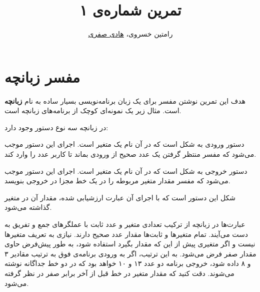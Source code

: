 \documentclass{utap}
\title{تمرین شماره‌ی ۱}
\author{رامتین خسروی، \href{mailto:hadi.safari@ut.ac.ir?subject=[AP\%20S98 A1]\%20}{هادی صفری}}
\begin{document}
    \maketitle

    \section{مفسر زبانچه}

    هدف این تمرین نوشتن مفسر برای یک زبان برنامه‌نویسی بسیار ساده به نام \textbf{زبانچه} است. مثال زیر یک نمونه‌ای کوچک از برنامه‌های زبانچه است.

    \begin{latin}
    
    \end{latin}

    در زبانچه سه نوع دستور وجود دارد:

    \begin{description}[leftmargin=6em,style=nextline,font=\labelitemi\quad\bfseries]
    \item[ورودی]
    دستور ورودی به شکل  است که در آن  نام یک متغیر است. اجرای این دستور موجب می‌شود که مفسر منتظر گرفتن یک عدد صحیح از ورودی بماند تا کاربر عدد را وارد کند.
    \item[خروجی]
    دستور خروجی به شکل  است که در آن  نام یک متغیر است. اجرای این دستور موجب می‌شود که مفسر مقدار متغیر مربوطه را در یک خط مجزا در خروجی بنویسد.
    \item[جایگزینی]
    شکل این دستور  است که با اجرای آن عبارت  ارزشیابی شده، مقدار آن در متغیر  گذاشته می‌شود.
    \end{description}

    عبارت‌ها در زبانچه از ترکیب تعدادی متغیر و عدد ثابت با عملگرهای جمع و تفریق به دست می‌آیند. تمام متغیرها و ثابت‌ها مقدار عدد صحیح دارند. نیازی به تعریف متغیرها نیست و اگر متغیری پیش از این که مقدار بگیرد استفاده شود، به طور پیش‌فرض حاوی مقدار صفر فرض می‌شود. به این ترتیب، اگر به ورودی برنامه‌ی فوق به ترتیب مقادیر ۳ و ۸ داده شود، خروجی برنامه دو عدد ۱۳ و ۱۰ خواهد بود که در دو خط جداگانه نوشته می‌شوند. دقت کنید که مقدار متغیر  در خط قبل از آخر برابر صفر در نظر گرفته می‌شود.
\end{document}
